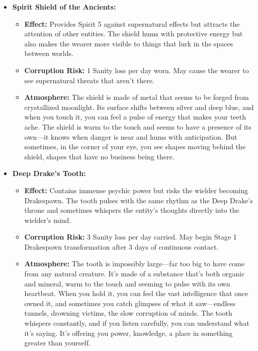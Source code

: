 \documentclass[11pt]{article}
\begin{document}
\begin{itemize}
\begin{itemize}
\item \textbf{Spirit Shield of the Ancients:} 
  \begin{itemize}
  \item \textbf{Effect:} Provides Spirit 5 against supernatural effects but attracts the attention of other entities. The shield hums with protective energy but also makes the wearer more visible to things that lurk in the spaces between worlds.
  \item \textbf{Corruption Risk:} 1 Sanity loss per day worn. May cause the wearer to see supernatural threats that aren't there.
  \item \textbf{Atmosphere:} The shield is made of metal that seems to be forged from crystallized moonlight. Its surface shifts between silver and deep blue, and when you touch it, you can feel a pulse of energy that makes your teeth ache. The shield is warm to the touch and seems to have a presence of its own—it knows when danger is near and hums with anticipation. But sometimes, in the corner of your eye, you see shapes moving behind the shield, shapes that have no business being there.
  \end{itemize}
\item \textbf{Deep Drake's Tooth:} 
  \begin{itemize}
  \item \textbf{Effect:} Contains immense psychic power but risks the wielder becoming Drakespawn. The tooth pulses with the same rhythm as the Deep Drake's throne and sometimes whispers the entity's thoughts directly into the wielder's mind.
  \item \textbf{Corruption Risk:} 3 Sanity loss per day carried. May begin Stage 1 Drakespawn transformation after 3 days of continuous contact.
  \item \textbf{Atmosphere:} The tooth is impossibly large—far too big to have come from any natural creature. It's made of a substance that's both organic and mineral, warm to the touch and seeming to pulse with its own heartbeat. When you hold it, you can feel the vast intelligence that once owned it, and sometimes you catch glimpses of what it saw—endless tunnels, drowning victims, the slow corruption of minds. The tooth whispers constantly, and if you listen carefully, you can understand what it's saying. It's offering you power, knowledge, a place in something greater than yourself.
  \end{itemize}
\end{itemize}


\end{itemize}
\end{document}
